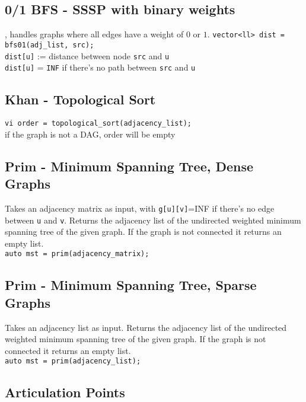 \subsection{0/1 BFS - SSSP with binary weights}
, handles graphs where all edges have a weight of $0$ or $1$.
\verb|vector<ll> dist = bfs01(adj_list, src);| \\
\verb|dist[u]| := distance between node \verb|src| and \verb|u| \\
\verb|dist[u]| = \verb|INF| if there's no path between \verb|src| and \verb|u|

\subsection{Khan - Topological Sort}

\verb|vi order = topological_sort(adjacency_list);| \\
if the graph is not a DAG, order will be empty


\subsection{Prim - Minimum Spanning Tree, Dense Graphs}

Takes an adjacency matrix as input, with \verb|g[u][v]|=INF if there's no edge between \verb|u| and \verb|v|.
Returns the adjacency list of the undirected weighted minimum spanning tree of the given graph.
If the graph is not connected it returns an empty list. \\
\verb|auto mst = prim(adjacency_matrix);| \\


\subsection{Prim - Minimum Spanning Tree, Sparse Graphs}

Takes an adjacency list as input.
Returns the adjacency list of the undirected weighted minimum spanning tree of the given graph.
If the graph is not connected it returns an empty list. \\
\verb|auto mst = prim(adjacency_list);| \\


\subsection{Articulation Points}

